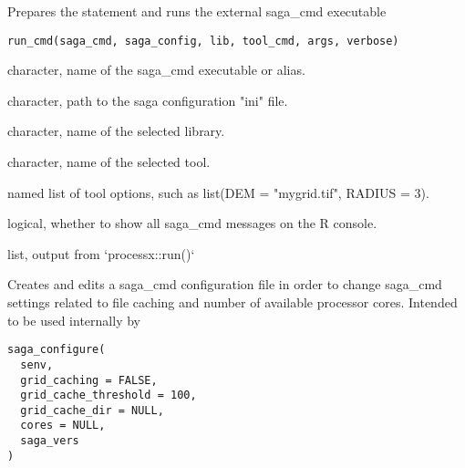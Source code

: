 \documentclass[a4paper]{book}
\begin{document}
%
\begin{Description}
Prepares the statement and runs the external saga\_cmd executable
\end{Description}
%
\begin{Usage}
\begin{verbatim}
run_cmd(saga_cmd, saga_config, lib, tool_cmd, args, verbose)
\end{verbatim}
\end{Usage}
%
\begin{Arguments}
\begin{ldescription}
\item[\code{saga\_cmd}] character, name of the saga\_cmd executable or alias.

\item[\code{saga\_config}] character, path to the saga configuration "ini" file.

\item[\code{lib}] character, name of the selected library.

\item[\code{tool\_cmd}] character, name of the selected tool.

\item[\code{args}] named list of tool options, such as list(DEM = "mygrid.tif",
RADIUS = 3).

\item[\code{verbose}] logical, whether to show all saga\_cmd messages on the R
console.
\end{ldescription}
\end{Arguments}
%
\begin{Value}
list, output from `processx::run()`
\end{Value}
%
\begin{Description}
Creates and edits a saga\_cmd configuration file in order to change saga\_cmd
settings related to file caching and number of available processor cores.
Intended to be used internally by 
\end{Description}
%
\begin{Usage}
\begin{verbatim}
saga_configure(
  senv,
  grid_caching = FALSE,
  grid_cache_threshold = 100,
  grid_cache_dir = NULL,
  cores = NULL,
  saga_vers
)
\end{verbatim}
\end{Usage}
\end{document}
